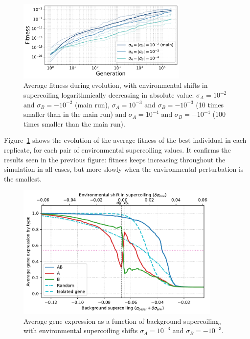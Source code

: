 \begin{figure}[H]
\centering
\includegraphics[width=0.75\textwidth]{param/sigma/fitness_all_with_main.pdf}
\caption[Average fitness during evolution, with decreasing environmental supercoiling shifts]{Average fitness during evolution, with environmental shifts in supercoiling logarithmically decreasing in absolute value: $\sigma_A = 10^{-2}$ and $\sigma_B = -10^{-2}$ (main run), $\sigma_A = 10^{-3}$ and $\sigma_B = -10^{-3}$ (10 times smaller than in the main run) and $\sigma_A = 10^{-4}$ and $\sigma_B = -10^{-4}$ (100 times smaller than the main run).}
\label{fig:param:sigma-fitness}
\end{figure}

Figure~\ref{fig:param:sigma-fitness} shows the evolution of the average fitness of the best individual in each replicate, for each pair of environmental supercoiling values.
It confirms the results seen in the previous figure: fitness keeps increasing throughout the simulation in all cases, but more slowly when the environmental perturbation is the smallest.

\begin{figure}[H]
\centering
\includegraphics[width=0.9\textwidth]{param/sigma/sigma-1e-3/activity_sigmas_avg.pdf}
\caption[Average gene expression as a function of background supercoiling, with an absolute environmental supercoiling shift of 0.001]{Average gene expression as a function of background supercoiling, with environmental supercoiling shifts $\sigma_A = 10^{-3}$ and $\sigma_B = -10^{-3}$.}
\label{fig:param:sigma-1e-3-activ-by-sigma}
\end{figure}

